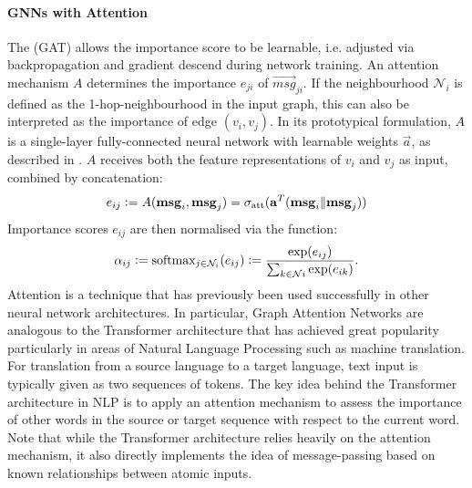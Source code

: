 \documentclass[
	fontsize=10pt, %
	twoside=false, %
	secnumdepth=1, %
]{kaobook}
\begin{document}
\paragraph{GNNs with Attention} The  (GAT)
\cite{velickovic_graph_2018} allows the importance score to be learnable, i.e.
adjusted via backpropagation and gradient descend during network training. An
attention mechanism $A$ determines the importance $e_{ji}$ of $\vec{msg}_{ji}$.
If the neighbourhood $\mathcal{N}_i$ is defined as the 1-hop-neighbourhood in
the input graph, this can also be interpreted as the importance of edge $(v_i,
v_j)$. In its prototypical formulation, $A$ is a single-layer fully-connected
neural network with learnable weights $\vec a$, as described in
. $A$ receives both the feature representations of
$v_i$ and $v_j$ as input, combined by concatenation:
\begin{align}
  e_{ij} := A(\mathbf{msg}_i, \mathbf{msg}_j) = \sigma_{\text{att}}(\mathbf{a}^T( \mathbf{msg}_i \| \mathbf{msg}_j))
\end{align}
Importance scores $e_{ij}$ are then normalised via the  function:
\begin{align}
  \alpha_{ij} := \text{softmax}_{j \in \mathcal{N}_i}(e_{ij}) := \frac{\exp(e_{ij})}{\sum_{k \in \mathcal{N}i} \exp(e_{ik})}.
\end{align}
Attention is a technique that has previously been used successfully in other
neural network architectures. In particular, Graph Attention Networks are
analogous to the Transformer architecture \cite{vaswani_AttentionAllYou_2017}
that has achieved great popularity particularly in areas of Natural Language
Processing such as machine translation. For translation from a source language
to a target language, text input is typically given as two sequences of tokens.
The key idea behind the Transformer architecture in NLP is to apply an attention
mechanism to assess the importance of other words in the source or target
sequence with respect to the current word.
Note that while the Transformer architecture relies heavily on the attention
mechanism, it also directly implements the idea of message-passing based on
known relationships between atomic inputs.

\end{document}
